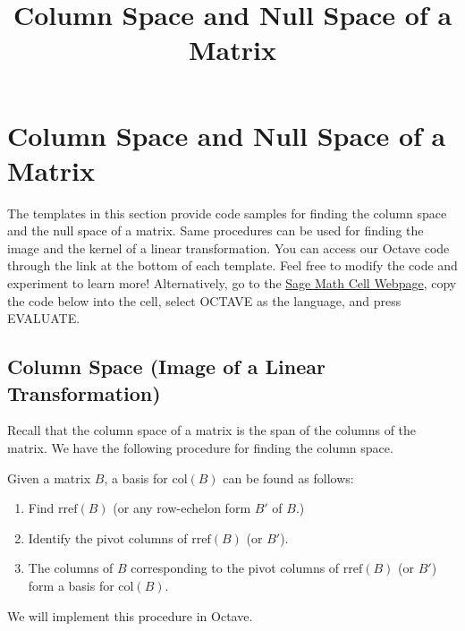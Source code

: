 \documentclass{ximera}
\title{Column Space and Null Space of a Matrix} \license{CC BY-NC-SA 4.0}
\begin{document}
\begin{abstract}
\end{abstract}
\maketitle
\section*{Column Space and Null Space of a Matrix}

The templates in this section provide code samples for finding the column space and the null space of a matrix.  Same procedures can be used for finding the image and the kernel of a linear transformation. You can access our Octave code through the link at the bottom of each template.  Feel free to modify the code and experiment to learn more!  Alternatively, go to the \href{https://sagecell.sagemath.org/}{Sage Math Cell Webpage}, copy the code below into the cell, select OCTAVE as the language, and press EVALUATE.  

\subsection*{Column Space (Image of a Linear Transformation)}

Recall that the column space of a matrix is the span of the columns of the matrix.  We have the following procedure for finding the column space.

\begin{procedure}[\ref{proc:colspace}]
Given a matrix $B$, a basis for $\mbox{col}(B)$ can be found as follows:
\begin{enumerate}
\item Find $\mbox{rref}(B)$ (or any row-echelon form $B'$ of $B$.)
\item Identify the pivot columns of $\mbox{rref}(B)$ (or $B'$).
\item The columns of $B$ corresponding to the pivot columns of $\mbox{rref}(B)$ (or $B'$) form a basis for $\mbox{col}(B)$.
\end{enumerate}
\end{procedure}

We will implement this procedure in Octave.
\end{document}
